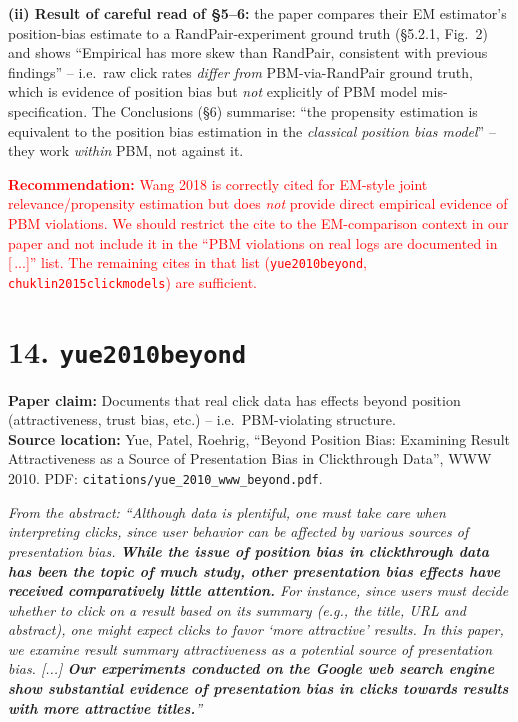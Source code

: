 \documentclass[11pt]{article}
\newcommand{\paperclaim}[1]{\textbf{Paper claim:} #1}
\newcommand{\source}[1]{\textbf{Source location:} #1}
\newcommand{\quoted}[1]{\begin{tcolorbox}\textit{#1}\end{tcolorbox}}
\begin{document}
\textbf{(ii) Result of careful read of \S5--6:} the paper compares
their EM estimator's position-bias estimate to a RandPair-experiment
ground truth (\S5.2.1, Fig.~2) and shows ``Empirical has more skew than
RandPair, consistent with previous findings'' -- i.e.\ raw click rates
\emph{differ from} PBM-via-RandPair ground truth, which is evidence of
position bias but \emph{not} explicitly of PBM model mis-specification.
The Conclusions (\S6) summarise: ``the propensity estimation is
equivalent to the position bias estimation in the \emph{classical
position bias model}'' -- they work \emph{within} PBM, not against it.

\textcolor{red}{\textbf{Recommendation:} Wang 2018 is correctly cited for
EM-style joint relevance/propensity estimation but does \emph{not}
provide direct empirical evidence of PBM violations. We should restrict
the cite to the EM-comparison context in our paper and not include it in
the ``PBM violations on real logs are documented in [\,...]'' list. The
remaining cites in that list (\texttt{yue2010beyond},
\texttt{chuklin2015clickmodels}) are sufficient.}

\bigskip

\section*{14. \texttt{yue2010beyond}}
\paperclaim{Documents that real click data has effects beyond position
(attractiveness, trust bias, etc.) -- i.e.\ PBM-violating structure.}\\
\source{Yue, Patel, Roehrig, ``Beyond Position Bias: Examining Result
Attractiveness as a Source of Presentation Bias in Clickthrough Data'',
WWW 2010. PDF: \texttt{citations/yue\_2010\_www\_beyond.pdf}.}

\quoted{From the abstract: ``Although data is plentiful, one must take
care when interpreting clicks, since user behavior can be affected by
various sources of presentation bias. \textbf{While the issue of position
bias in clickthrough data has been the topic of much study, other
presentation bias effects have received comparatively little attention.}
For instance, since users must decide whether to click on a result based
on its summary (e.g., the title, URL and abstract), one might expect
clicks to favor `more attractive' results. In this paper, we examine
result summary attractiveness as a potential source of presentation
bias. [...] \textbf{Our experiments conducted on the Google web search
engine show substantial evidence of presentation bias in clicks towards
results with more attractive titles.}''}
\end{document}
